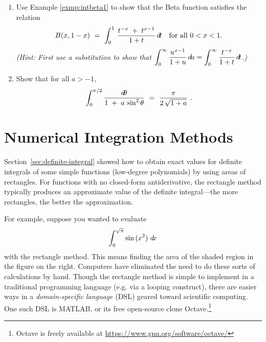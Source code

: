 {\begin{enumerate}[\bfseries 1.]
to show that for all $a > 0$,
\[
\int \frac{\dx}{\sqrt{a^2 + x^2}} ~=~ \ln\;\Abs{x + \sqrt{a^2 + x^2}\,} ~+~ C ~.
\]
 \item Use Example \ref{exmp:intbeta1} to show that the Beta function satisfies
  the relation
\[
B(x,1-x) ~=~ \int_0^1 \,\frac{t^{-x} \;+\; t^{x-1}}{1 + t}\,d\!t
\quad\text{for all $0 < x < 1$.}
\]
\emph{(Hint: First use a substitution to show that
$\displaystyle\int_0^{\infty} \dfrac{u^{x-1}}{1 + u}\,d\!u = 
 \displaystyle\int_0^{\infty} \dfrac{t^{-x}}{1 + t}\,d\!t$.)}
 \item Show that for all $a > -1$,
\[
\int_0^{\pi/2} \frac{d\!\theta}{1 \;+\; a\,\sin^2 \theta} ~=~ \frac{\pi}{2\,\sqrt{1+a}} ~.
\]
\end{enumerate}
}
\newpage
\section{Numerical Integration Methods}
Section~\ref{sec:definite-integral} showed how to obtain exact values for definite integrals of some
simple functions (low-degree polynomials) by using areas of rectangles. For
functions with no closed-form antiderivative, the rectangle method typically
produces an approximate value of the definite integral---the more rectangles,
the better the approximation.

For example, suppose you wanted to evaluate
\[
\int_0^{\sqrt{\pi}} \sin\,(x^2)~d\!x
\]
with the rectangle method. This means finding the area of the shaded region in
the figure on the right. Computers have eliminated the need to do these sorts of
calculations by hand. Though the rectangle method is simple to implement in a
traditional programming language (e.g. via a looping construct), there are
easier ways in a \emph{domain-specific language} (DSL) geared toward scientific
computing. One such DSL is MATLAB\textsuperscript{\textregistered}, or its free
open-source clone Octave.\footnote{Octave is freely available at
\url{https://www.gnu.org/software/octave/}}

